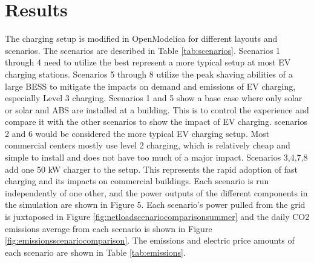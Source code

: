 \documentclass[conference]{IEEEtran}
\begin{document}
\section{Results}
	The charging setup is modified in OpenModelica for different layouts and scenarios. The scenarios are described in Table \ref{tab:scenarios}. Scenarios 1 through 4 need to utilize the best represent a more typical setup at most EV charging stations. Scenarios 5 through 8 utilize the peak shaving abilities of a large BESS to mitigate the impacts on demand and emissions of EV charging, especially Level 3 charging. Scenarios 1 and 5 show a base case where only solar or solar and ABS are installed at a building. This is to control the experience and compare it with the other scenarios to show the impact of EV charging. scenarios 2 and 6 would be considered the more typical EV charging setup. Most commercial centers mostly use level 2 charging, which is relatively cheap and simple to install and does not have too much of a major impact. Scenarios 3,4,7,8 add one 50 kW charger to the setup. This represents the rapid adoption of fast charging and its impacts on commercial buildings.   Each scenario is run independently of one other, and the power outputs of the different components in the simulation are shown in Figure 5. Each scenario’s power pulled from the grid is juxtaposed in Figure \ref{fig:netloadscenariocomparisonsummer} and the daily CO2 emissions average from each scenario is shown in Figure \ref{fig:emissionsscenariocomparison}. The emissions and electric price amounts of each scenario are shown in Table \ref{tab:emissions}. 
\end{document}
